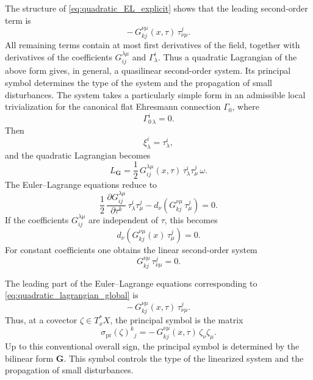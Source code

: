\documentclass[11pt]{amsart}
\theoremstyle{plain}
\theoremstyle{definition}
\theoremstyle{remark}
\begin{document}
The structure of \eqref{eq:quadratic_EL_explicit} shows that the leading second-order term is
\[
-\,G^{\nu\mu}_{kj}(x,\tau)\,\tau^j_{\nu\mu}.
\]
All remaining terms contain at most first derivatives of the field, together with derivatives of the coefficients \(G^{\lambda\mu}_{ij}\) and \(\Gamma^i_\lambda\). 
Thus a quadratic Lagrangian of the above form gives, in general, a quasilinear second-order system. 
Its principal symbol determines the type of the system and the propagation of small disturbances.
The system takes a particularly simple form in an admissible local trivialization for the canonical flat Ehresmann connection \(\Gamma_0\), where
\[
\Gamma^i_{0\,\lambda}=0.
\]
Then
\[
\xi^i_\lambda=\tau^i_\lambda,
\]
and the quadratic Lagrangian becomes
\begin{equation}
	L_{\mathbf G}
	=
	\frac12\,G^{\lambda\mu}_{ij}(x,\tau)\,
	\tau^i_\lambda\tau^j_\mu\,\omega.
	\label{eq:quadratic_lagrangian_flat_trivialization}
\end{equation}
The Euler--Lagrange equations reduce to
\begin{equation}
	\frac12\,
	\frac{\partial G^{\lambda\mu}_{ij}}{\partial \tau^k}\,
	\tau^i_\lambda\tau^j_\mu
	-
	d_\nu\!\left(
	G^{\nu\mu}_{kj}\,\tau^j_\mu
	\right)
	=0.
	\label{eq:quadratic_EL_flat_explicit}
\end{equation}
If the coefficients \(G^{\lambda\mu}_{ij}\) are independent of \(\tau\), this becomes
\begin{equation}
	d_\nu\!\left(
	G^{\nu\mu}_{kj}(x)\,\tau^j_\mu
	\right)=0.
	\label{eq:quadratic_EL_tau_independent}
\end{equation}
For constant coefficients one obtains the linear second-order system
\begin{equation}
	G^{\nu\mu}_{kj}\,\tau^j_{\nu\mu}=0.
	\label{eq:quadratic_EL_constant_coefficients}
\end{equation}

The leading part of the Euler--Lagrange equations corresponding to 
\eqref{eq:quadratic_lagrangian_global} is
\[
-\,G^{\nu\mu}_{kj}(x,\tau)\,\tau^j_{\nu\mu}.
\]
Thus, at a covector \(\zeta\in T_x^*X\), the principal symbol is the matrix
\begin{equation}
	\sigma_{\mathrm{pr}}(\zeta)^k{}_j
	=
	-\,G^{\nu\mu}_{kj}(x,\tau)\,\zeta_\nu\zeta_\mu.
	\label{eq:principal_symbol_quadratic}
\end{equation}
Up to this conventional overall sign, the principal symbol is determined by the bilinear form \(\mathbf G\). 
This symbol controls the type of the linearized system and the propagation of small disturbances.
\end{document}
